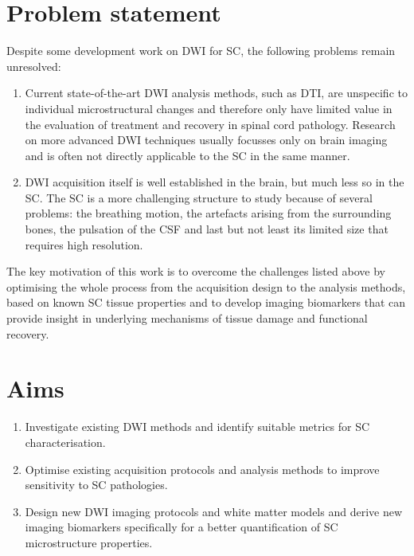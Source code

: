 

\section{Problem statement}
Despite some development work on \gls{DWI} for \gls{SC}, the following problems remain unresolved:
\begin{enumerate}
\item Current state-of-the-art \gls{DWI} analysis methods, such as \gls{DTI}, are unspecific to individual microstructural changes and therefore only have limited value in the evaluation of treatment and recovery in spinal cord pathology. Research on more advanced \gls{DWI} techniques usually focusses only on brain imaging and is often not directly applicable to the \gls{SC} in the same manner.
\item \gls{DWI} acquisition itself is well established in the brain, but much less so in the \gls{SC}. The \gls{SC} is a more challenging structure to study because of several problems: the breathing motion, the artefacts arising from the surrounding bones, the pulsation of the {\gls{CSF}} and last but not least its limited size that requires high resolution.  
\end{enumerate} 
The key motivation of this work is to overcome the challenges listed above by optimising the whole process from the acquisition design to the analysis methods, based on known \gls{SC} tissue properties and to develop imaging biomarkers that can provide insight in underlying mechanisms of tissue damage and functional recovery.

\section{Aims}
\begin{enumerate}
  \item Investigate existing \gls{DWI} methods and identify suitable metrics for \gls{SC} characterisation.
  \item Optimise existing acquisition protocols and analysis methods to improve sensitivity to \gls{SC} pathologies.
  \item Design new \gls{DWI} imaging protocols and white matter models and derive new imaging biomarkers specifically for a better quantification of \gls{SC} microstructure properties.
\end{enumerate}

